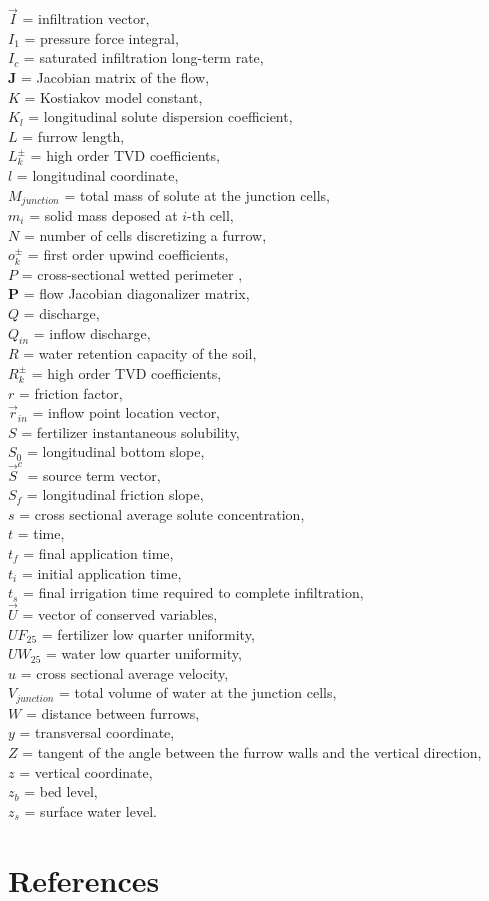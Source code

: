 \documentclass[review,authoryear]{elsarticle}
\begin{document}
$\vec{I}$ = infiltration vector,\\
$I_1$ = pressure force integral,\\
$I_c$ = saturated infiltration long-term rate,\\
$\mathbf{J}$ = Jacobian matrix of the flow,\\
$K$ = Kostiakov model constant,\\
$K_l$ = longitudinal solute dispersion coefficient,\\
$L$ = furrow length,\\
$L_k^\pm$ = high order TVD coefficients,\\
$l$ = longitudinal coordinate,\\
$M_{junction}$ = total mass of solute at the junction cells,\\
$m_i$ = solid mass deposed at $i$-th cell,\\
$N$ = number of cells discretizing a furrow,\\
$o_k^\pm$ = first order upwind coefficients,\\
$P$ = cross-sectional wetted perimeter ,\\
$\mathbf{P}$ = flow Jacobian diagonalizer matrix,\\
$Q$ = discharge,\\
$Q_{in}$ = inflow discharge,\\
$R$ = water retention capacity of the soil,\\
$R_k^\pm$ = high order TVD coefficients,\\
$r$ = friction factor,\\
$\vec{r}_{in}$ = inflow point location vector,\\
$S$ = fertilizer instantaneous solubility,\\
$S_0$ = longitudinal bottom slope,\\
$\vec{S}^c$ = source term vector,\\
$S_f$ = longitudinal friction slope,\\
$s$ = cross sectional average solute concentration,\\
$t$ = time,\\
$t_f$ = final application time,\\
$t_i$ = initial application time,\\
$t_s$ = final irrigation time required to complete infiltration,\\
$\vec{U}$ = vector of conserved variables,\\
$UF_{25}$ = fertilizer low quarter uniformity,\\
$UW_{25}$ = water low quarter uniformity,\\
$u$ = cross sectional average velocity,\\
$V_{junction}$ = total volume of water at the junction cells,\\
$W$ = distance between furrows,\\
$y$ = transversal coordinate,\\
$Z$ = tangent of the angle between the furrow walls and the vertical direction,
\\
$z$ = vertical coordinate,\\
$z_b$ = bed level,\\
$z_s$ = surface water level.

\section*{References}

\end{document}
